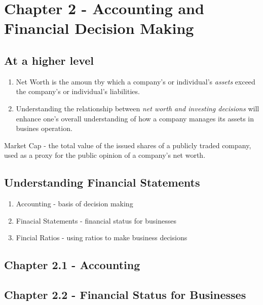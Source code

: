 \documentclass{report} %
\begin{document}
\section*{Chapter 2 - Accounting and Financial Decision Making}
\subsection*{At a higher level}
\begin{enumerate}
    \item Net Worth is the amoun tby which a company's or individual's \emph{assets} exceed the company's or individual's liabilities.
    \item Understanding the relationship between \emph{net worth and investing decisions} will enhance one's overall understanding of how a company manages its assets in busines operation.
\end{enumerate}
Market Cap - the total value of the issued shares of a publicly traded company, used as a proxy for the public opinion of a company's net worth.
\subsection*{Understanding Financial Statements}
\begin{enumerate}
    \item Accounting - basis of decision making
    \item Finacial Statements - financial status for businesses
    \item Fincial Ratios - using ratios to make business decisions
\end{enumerate}

\subsection*{Chapter 2.1 - Accounting}

\subsection*{Chapter 2.2 - Financial Status for Businesses}
\end{document}
